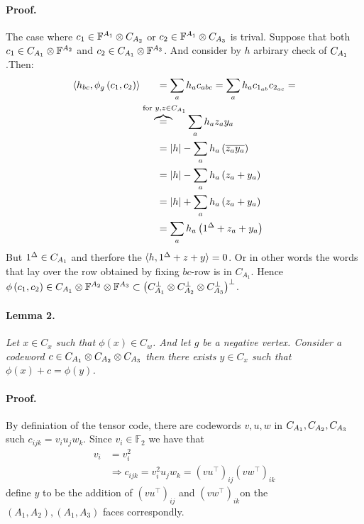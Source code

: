 \documentclass{article}
\begin{document}
\begin{multicols*}{2}
    \paragraph{Proof.} The case where $c_{1} \in \mathbb{F}^{A_{1}} \otimes C_{A_{2}}$ or $c_{2} \in \mathbb{F}^{A_{1}} \otimes C_{A_{3}} $ is trival. Suppose that both $ c_{1} \in C_{A_{1}} \otimes \mathbb{F}^{A_{2}}$ and $ c_{2} \in C_{A_{1}} \otimes \mathbb{F}^{A_{3}}$. And consider by $h$ arbirary check of $C_{A_{1}}$.Then: 
    \begin{equation*}
      \begin{split}
	\braket{h_{bc}, \phi_{g} \left( c_1, c_2 \right)  } & \ \ \ \ \ = \sum_{a}{h_{a}c_{abc}} = 
	  \sum_{a}{h_{a}c_{1_{ab}}c_{2_{ac}}} = \\ 
	  &\overset{\text{ for  } y,z\in \Aa}{\overbrace{=}}  \sum_{a} h_{a}z_{a}y_{a} \\ 
	  &\ \ \ \ \ = |h| -  \sum_{a} {h_{a} \left( \overline{ z_{a}y_{a}}  \right)} \\
	  &\ \ \ \ \ = |h| -  \sum_{a} {h_{a} \left( z_{a} + y_{a}  \right)} \\  
	  &\ \ \ \ \ = |h| +  \sum_{a} {h_{a} \left( z_{a} + y_{a}  \right)} \\ 
	  &\ \ \ \ \ =  \sum_{a} {h_{a} \left( 1^{\Delta} + z_{a} + y_{a}  \right)} 
      \end{split}
    \end{equation*}
    But $1^{\Delta} \in C_{A_{1}}$ and therfore the $ \braket{h, 1^{\Delta} + z + y} = 0 $. Or in other words the words that lay over the row obtained by fixing $bc$-row is in $ C_{A_{1}}$. Hence $\phi \left( c_{1}, c_{2} \right) \in C_{A_{1}}\otimes \mathbb{F}^{A_{2}} \otimes \mathbb{F}^{A_{3}} \subset \left( C_{A_{1}}^{\perp} \otimes C_{A_{2}}^{\perp} \otimes C_{A_{3}}^{\perp} \right)^\perp$.   

    \paragraph{Lemma 2.} \textit{ Let $x \in C_{x}$ such that $ \phi(x) \in C_{w}$. And let $g$ be a negative vertex. Consider a codeword $c \in C_{A_{1}} \otimes C_{A_{2}} \otimes C_{A_{3}}$ then there exists $y \in C_{x}$ such that $\phi\left( x \right) + c  = \phi\left(y\right)$.   }
    \paragraph{Proof.} By definiation of the tensor code, there are codewords $v,u,w$ in $C_{A_{1}}, C_{A_{2}}, C_{A_{3}}$ such $ c_{ijk} = v_{i}u_{j}w_{k}$. Since $v_{i} \in \mathbb{F}_{2}$ we have that
    \begin{equation*}
      \begin{split}
	 v_{i} &= v_{i}^{2} \\
	 &\Rightarrow c_{ijk}= v_{i}^{2}u_{j}w_{k}=\left( vu^{\top} \right)_{ij}\left( vw^{\top} \right)_{ik}
      \end{split}
    \end{equation*}
    define $y$ to be the addition of  $\left( vu^{\top} \right)_{ij}$ and $\left( vw^{\top} \right)_{ik}$on the $\left(A_{1},A_{2}  \right), \left(A_{1}, A_{3}\right) $ faces correspondly. 


\end{multicols*}
\end{document}
